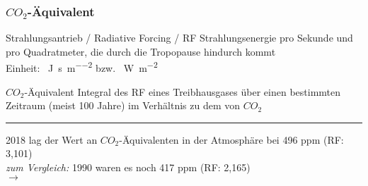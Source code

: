\begin{frame}
	\frametitle{$CO_2$-Äquivalent}
	
	\begin{block}{Strahlungsantrieb / Radiative Forcing / RF}
		Strahlungsenergie pro Sekunde und pro Quadratmeter, die durch die Tropopause hindurch kommt \\
		Einheit: \SI{}{\joule\per\second\per\square\metre} bzw. \SI{}{\watt\per\square\meter}
	\end{block}
	
	\begin{block}{$CO_2$-Äquivalent}
		Integral des RF eines Treibhausgases über einen bestimmten Zeitraum (meist 100 Jahre) im Verhältnis zu dem von $CO_2$
		
	\end{block}


	\color{gray}\rule{\linewidth}{1pt}
	
	\color{black}

	2018 lag der Wert an $CO_2$-Äquivalenten in der Atmosphäre bei 496 ppm (RF: 3,101)\\
	\textit{zum Vergleich: } 1990 waren es noch 417 ppm (RF: 2,165)\\
	$\rightarrow$ \color{red}{Zuwachs des Strahlungsantriebs um 43 \% seit 1990}
\end{frame}

